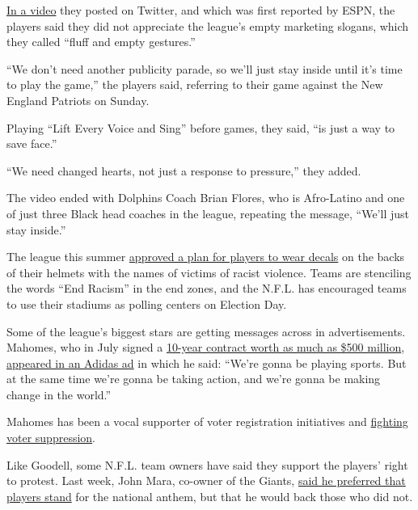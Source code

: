 \href{https://twitter.com/realjaywilliams/status/1304186433054420992?s=12}{In
a video} they posted on Twitter, and which was first reported by ESPN,
the players said they did not appreciate the league's empty marketing
slogans, which they called ``fluff and empty gestures.''

``We don't need another publicity parade, so we'll just stay inside
until it's time to play the game,'' the players said, referring to their
game against the New England Patriots on Sunday.

Playing ``Lift Every Voice and Sing'' before games, they said, ``is just
a way to save face.''

``We need changed hearts, not just a response to pressure,'' they added.

The video ended with Dolphins Coach Brian Flores, who is Afro-Latino and
one of just three Black head coaches in the league, repeating the
message, ``We'll just stay inside.''

The league this summer
\href{https://www.seahawks.com/news/seahawks-to-wear-helmet-decals-supporting-social-justice-initiatives-honoring-vi}{approved
a plan for players to wear decals} on the backs of their helmets with
the names of victims of racist violence. Teams are stenciling the words
``End Racism'' in the end zones, and the N.F.L. has encouraged teams to
use their stadiums as polling centers on Election Day.

Some of the league's biggest stars are getting messages across in
advertisements. Mahomes, who in July signed a
\href{https://www.nytimes3xbfgragh.onion/2020/07/06/sports/football/pat-mahomes-contract.html}{10-year
contract worth as much as \$500 million},
\href{https://twitter.com/PatrickMahomes/status/1303504412242071552}{appeared
in an Adidas ad} in which he said: ``We're gonna be playing sports. But
at the same time we're gonna be taking action, and we're gonna be making
change in the world.''

Mahomes has been a vocal supporter of voter registration initiatives and
\href{https://chiefswire.usatoday.com/2020/06/23/kansas-city-chiefs-patrick-mahomes-lebron-james-more-than-a-vote/}{fighting
voter suppression}.

Like Goodell, some N.F.L. team owners have said they support the
players' right to protest. Last week, John Mara, co-owner of the Giants,
\href{https://www.giants.com/news/john-mara-joe-judge-daniel-jones-saquon-barkley-jabrill-peppers-training-camp}{said
he preferred that players stand} for the national anthem, but that he
would back those who did not.

